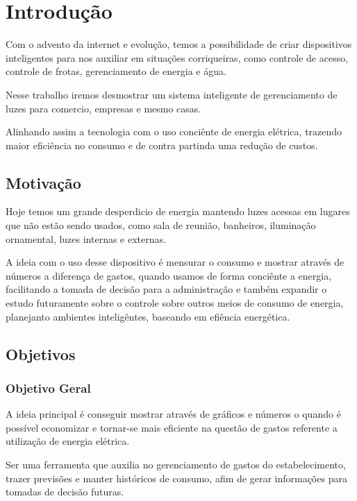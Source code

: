 \documentclass[openright]{normas-utf-tex} %
\begin{document}
\setcounter{page}{12}


\chapter{Introdução}


Com o advento da internet e evolução, temos a possibilidade de criar dispositivos inteligentes \cite{Novatec} para nos auxiliar em situações corriqueiras, como controle de acesso, controle de frotas, gerenciamento de energia e água.

Nesse trabalho iremos desmostrar um sistema inteligente de gerenciamento de luzes para comercio, empresas e mesmo casas.

Alinhando assim a tecnologia com o uso conciênte de energia elétrica, trazendo maior eficiência no consumo e de contra partinda uma redução de custos.

\section{Motivação}

Hoje temos um grande desperdicio de energia mantendo luzes acessas em lugares que não estão sendo usados, como sala de reunião, banheiros, iluminação ornamental, luzes internas e externas.

A ideia com o uso desse dispositivo é mensurar o consumo e mostrar através de números a diferença de gastos, quando usamos de forma conciênte a energia, facilitando a tomada de decisão para a administração e também expandir o estudo futuramente sobre o controle sobre outros meios de consumo de energia, planejanto ambientes inteligêntes, baseando em efiência energética.

\section{Objetivos}

\subsection{Objetivo Geral}

A ideia principal é conseguir mostrar através de gráficos e números o quando é possível economizar e tornar-se mais eficiente na questão de gastos referente a utilização de energia elétrica.

Ser uma ferramenta que auxilia no gerenciamento de gastos do estabelecimento, trazer previsões e manter históricos de consumo, afim de gerar informações para tomadas de decisão futuras.
\end{document}
